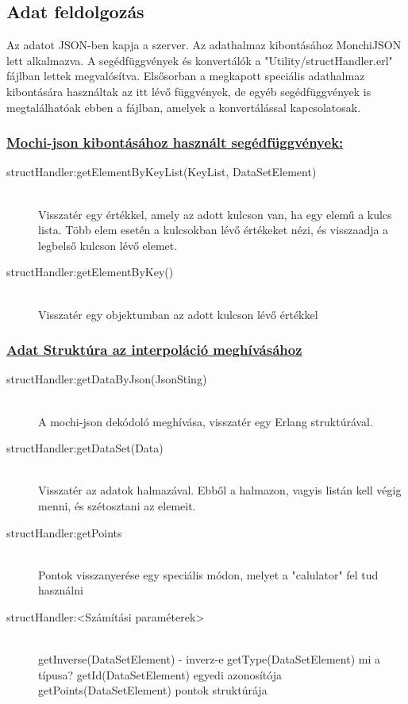 \subsection{Adat feldolgozás}
	Az adatot JSON-ben kapja a szerver. Az adathalmaz kibontásához MonchiJSON lett alkalmazva. 
	A segédfüggvények és konvertálók a "Utility/structHandler.erl" fájlban lettek megvalósítva.\newline
	Elsősorban a megkapott speciális adathalmaz kibontására használtak az itt lévő függvények, de egyéb segédfüggvények is megtalálhatóak ebben a fájlban, amelyek a konvertálással kapcsolatosak.

	\subsubsection{\underline{
		Mochi-json kibontásához használt segédfüggvények:
	}}
	\begin{description}
		\item[structHandler:getElementByKeyList(KeyList, DataSetElement)] \hfill \\ 
		Visszatér egy értékkel, amely az adott kulcson van, ha egy elemű a kulcs lista. Több elem esetén a kulcsokban lévő értékeket nézi, és visszaadja a legbelső kulcson lévő elemet.

		\item[structHandler:getElementByKey()] \hfill \\ 
		Visszatér egy objektumban az adott kulcson lévő értékkel
	\end{description}
	\subsubsection{\underline{Adat Struktúra az interpoláció meghívásához}}
	\begin{description}

		\item[structHandler:getDataByJson(JsonSting)] \hfill \\
		A mochi-json dekódoló meghívása, visszatér egy Erlang struktúrával.
		
		\item[structHandler:getDataSet(Data)]\hfill \\ 
		Visszatér az adatok halmazával. Ebből a halmazon, vagyis listán kell végig menni, és szétosztani az elemeit. 
		
		\item[structHandler:getPoints] \hfill \\
		Pontok visszanyerése egy speciális módon, melyet a "calulator" fel tud használni

		

		\item[structHandler:<Számítási paraméterek>] \hfill \\ 
		getInverse(DataSetElement) - inverz-e \newline
		getType(DataSetElement) mi a típusa? \newline
		getId(DataSetElement) egyedi azonosítója \newline
		getPoints(DataSetElement) pontok struktúrája
	\end{description}
